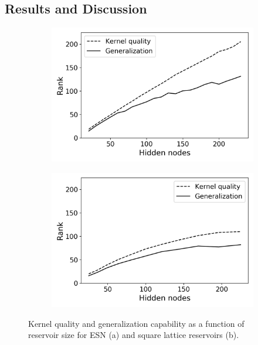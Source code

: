\subsection{Results and Discussion}

\begin{figure}[t]
  \centering
  \begin{subfigure}{.49\textwidth}
    \centering
    \includegraphics[width=1.0\linewidth]{figures/esn-rank.png}
    \caption{}
    \label{fig:rank-a}
  \end{subfigure}
  \begin{subfigure}{.49\textwidth}
    \centering
    \includegraphics[width=1.0\linewidth]{figures/sq-rank.png}
    \caption{}
    \label{fig:rank-b}
  \end{subfigure}
  \caption{
    Kernel quality and generalization capability as a function of reservoir size
for ESN (a) and square lattice reservoirs (b).
  }
  \label{fig:rank}
\end{figure}

